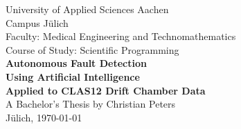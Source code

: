 \begin{titlepage}
  \begin{center}
    \LARGE{University of Applied Sciences Aachen\\}
    \Large{Campus J\"ulich\\}
    \vspace{2cm}
    \Large{Faculty: Medical Engineering and Technomathematics\\}
    \Large{Course of Study: Scientific Programming\\}
    \vspace{3cm}
    \LARGE{\textbf{Autonomous Fault Detection\\}}
    \LARGE{\textbf{Using Artificial Intelligence\\}}
    \LARGE{\textbf{Applied to CLAS12 Drift Chamber Data\\}}
    \vspace{3cm}
    \Large{A Bachelor's Thesis by Christian Peters\\}
    \vspace{2cm}
    \Large{J\"ulich, \today}
  \end{center}
\end{titlepage}
